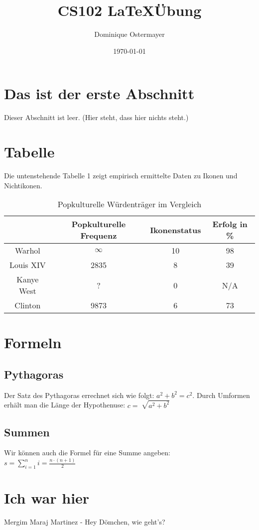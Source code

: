 \documentclass{article}
\author{Dominique Ostermayer}
\title{CS102 \LaTeX	\"Ubung}
\date{\today}
\begin{document}
\maketitle

\section{Das ist der erste Abschnitt}
Dieser Abschnitt ist leer. (Hier steht, dass hier nichts steht.)

\section{Tabelle}
Die untenstehende Tabelle 1 zeigt empirisch ermittelte Daten zu Ikonen und Nichtikonen.

\begin{table}[h]
\centering
\begin{tabular}{c|c|c|c}
\hspace{3 pt} & Popkulturelle Frequenz & Ikonenstatus & Erfolg in \% \\
\hline
Warhol & $\infty$ & 10 & 98 \\
Louis XIV & 2835 & 8 & 39 \\
Kanye West & ? & 0 & N/A \\
Clinton & 9873 & 6 & 73
\end{tabular}
\caption{Popkulturelle W\"urdentr\"ager im Vergleich}
\end{table}

\section{Formeln}
\subsection{Pythagoras}
Der Satz des Pythagoras errechnet sich wie folgt: $a^2 + b^2 = c^2$. Durch Umformen erh\"alt man die L\"ange der Hypothenuse: $c = \sqrt[]{a^2 + b^2}$ \\
\subsection{Summen}
Wir k\"onnen auch die Formel f\"ur eine Summe angeben: \\

$s = \sum\limits_{i=1}^n i = \frac{n \cdot (n + 1)}{2}$
\centering

\section{Ich war hier}
Mergim Maraj Martinez - Hey Dömchen, wie geht's?


   
\end{document}
